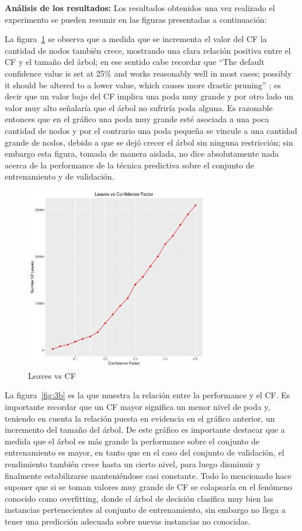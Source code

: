 \textbf{Análisis de los resultados:} Los resultados obtenidos una vez realizado el experimento
se pueden resumir en las figuras presentadas a continuación:

La figura~\ref{fig:3a} se observa que a medida que se incrementa el valor del CF la
cantidad de nodos también crece, mostrando una clara relación positiva entre el CF y el
tamaño del árbol; en ese sentido cabe recordar que ``The default confidence value is set at
25\% and works reasonably well in most cases; possibly it should be altered to a lower
value, which causes more drastic pruning'' \cite{witten2005data}; es decir que un valor bajo del CF implica una
poda muy grande y por otro lado un valor muy alto señalaría que el árbol no sufriría poda
alguna. Es razonable entonces que en el gráfico una poda muy grande esté asociada a
una poca cantidad de nodos y por el contrario una poda pequeña se vincule a una
cantidad grande de nodos, debido a que se dejó crecer el árbol sin ninguna restricción; sin
embargo esta figura, tomada de manera aislada, no dice absolutamente nada acerca de la
performance de la técnica predictiva sobre el conjunto de entrenamiento y de validación.

\begin{figure}
  \centering
  \includegraphics[width = 8cm]{3a.pdf}
  \caption{Leaves vs CF}
  \label{fig:3a}
\end{figure}

La figura~\ref{fig:3b} es la que muestra la relación entre la performance y el CF. Es
importante recordar que un CF mayor significa un menor nivel de poda y, teniendo en
cuenta la relación puesta en evidencia en el gráfico anterior, un incremento del tamaño del
árbol. De este gráfico es importante destacar que a medida que el árbol es más grande la
performance sobre el conjunto de entrenamiento es mayor, en tanto que en el caso del conjunto
de validación, el rendimiento también crece hasta un cierto nivel, para luego disminuir y
finalmente estabilizarse manteniéndose casi constante. Todo lo mencionado hace
suponer que si se toman valores muy grande de CF se colapsaría en el fenómeno
conocido como overfitting, donde el árbol de decisión clasifica muy bien las instancias 
pertenecientes al conjunto de entrenamiento, sin embargo no llega a tener una predicción
adecuada sobre nuevas instancias no conocidas.

